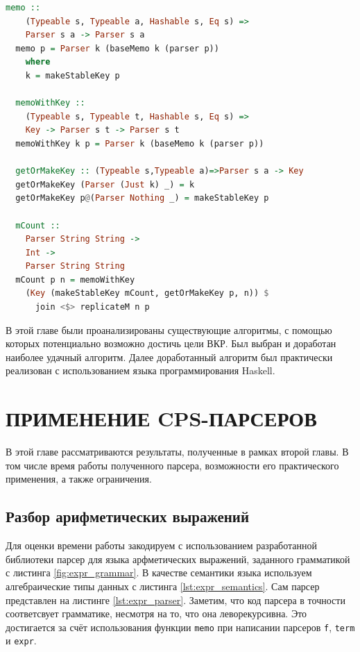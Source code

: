 \documentclass[times]{itmo-student-thesis}
\begin{document}
\begin{lstlisting}[language=Haskell,float=!h,caption={Исправленный mCount},label={lst:mcount_fixed}]
  memo :: 
    (Typeable s, Typeable a, Hashable s, Eq s) => 
    Parser s a -> Parser s a
  memo p = Parser k (baseMemo k (parser p))
    where
    k = makeStableKey p

  memoWithKey :: 
    (Typeable s, Typeable t, Hashable s, Eq s) => 
    Key -> Parser s t -> Parser s t
  memoWithKey k p = Parser k (baseMemo k (parser p))

  getOrMakeKey :: (Typeable s,Typeable a)=>Parser s a -> Key
  getOrMakeKey (Parser (Just k) _) = k
  getOrMakeKey p@(Parser Nothing _) = makeStableKey p

  mCount :: 
    Parser String String -> 
    Int -> 
    Parser String String
  mCount p n = memoWithKey 
    (Key (makeStableKey mCount, getOrMakeKey p, n)) $ 
      join <$> replicateM n p
\end{lstlisting}

\chapterconclusion

В этой главе были проанализированы существующие алгоритмы, с помощью которых потенциально возможно достичь цели ВКР. 
Был выбран и доработан наиболее удачный алгоритм. Далее доработанный алгоритм был практически реализован с использованием 
языка программирования Haskell.

\chapter{ПРИМЕНЕНИЕ CPS-ПАРСЕРОВ}

В этой главе рассматриваются результаты, полученные в рамках второй главы. В том числе время работы полученного парсера,
возможности его практического применения, а также ограничения. 

\section{Разбор арифметических выражений}\label{sec:arith_expr}

Для оценки времени работы закодируем с использованием разработанной библиотеки парсер для языка арфметических
выражений, заданного грамматикой с листинга  \ref{fig:expr_grammar}. В качестве семантики языка используем
алгебраические типы данных с листинга \ref{lst:expr_semantics}. Сам парсер представлен на листинге \ref{lst:expr_parser}.
Заметим, что код парсера в точности соответсвует грамматике, несмотря на то, что она леворекурсивна. Это достигается за счёт
использования функции \lstinline{memo} при написании парсеров \lstinline{f}, \lstinline{term} и \lstinline{expr}.
\end{document}
